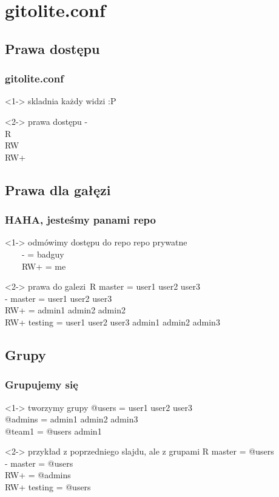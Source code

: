 \documentclass[10pt]{beamer}
\begin{document}
\section{gitolite.conf}
\subsection{Prawa dostępu}
\begin{frame}
	\frametitle{gitolite.conf}
	\begin{block}<1->
	{skladnia}
	każdy widzi :P
	\end{block}
	\begin{block}<2->
	{prawa dostępu}
	-\\
	R\\
	RW\\
	RW+
	\end{block}
\end{frame}
\subsection{Prawa dla gałęzi}
\begin{frame}
	\frametitle{HAHA, jesteśmy panami repo}
	\begin{block}<1->
	{odmówimy dostępu do repo}
	repo prywatne\\
	\ \ \ \ - = badguy\\
	\ \ \ \ RW+ = me
	\end{block}
	\begin{block}<2->
	{prawa do galezi}\
	R master = user1 user2 user3\\
	- master = user1 user2 user3\\
	RW+ = admin1 admin2 admin2\\
	RW+ testing = user1 user2 user3 admin1 admin2 admin3
	\end{block}
\end{frame}
\subsection{Grupy}
\begin{frame}
	\frametitle{Grupujemy się}	
	\begin{block}<1->
	{tworzymy grupy}
	@users = user1 user2 user3\\
	@admins = admin1 admin2 admin3\\
	@team1 = @users admin1
	\end{block}
	\begin{block}<2->
	{przykład z poprzedniego slajdu, ale z grupami}
	R master = @users\\
	- master = @users\\
	RW+ = @admins\\
	RW+ testing = @users
	\end{block}
\end{frame}
\end{document}
